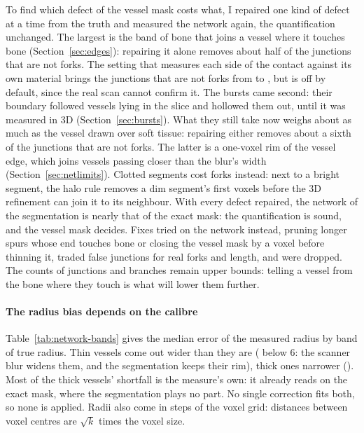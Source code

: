 To find which defect of the vessel mask costs what, I repaired one kind of defect at a time from the
truth and measured the network again, the quantification unchanged. The largest is the band of bone
that joins a vessel where it touches bone (Section~\ref{sec:edges}): repairing it alone removes about
half of the junctions that are not forks. The setting that measures each side of the contact against
its own material brings the junctions that are not forks from \pbValueExpDefaultSpurious{} to
\pbValueExpBoneSideSpurious, but is off by default, since the real scan cannot confirm it.
The bursts came second: their boundary followed vessels lying in the slice and hollowed them out,
until it was measured in 3D (Section~\ref{sec:bursts}). What they still take now weighs about as much
as the vessel drawn over soft tissue: repairing either removes about a sixth of the junctions that are
not forks. The latter is a one-voxel rim of the vessel edge, which joins vessels passing closer than
the blur's width (Section~\ref{sec:netlimits}). Clotted segments cost forks instead: next to a
bright segment, the halo rule removes a dim segment's first voxels before the 3D refinement can join it
to its neighbour. With every defect repaired, the network of the segmentation is nearly that of
the exact mask: the quantification is sound, and the vessel mask decides. Fixes tried on
the network instead, pruning longer spurs whose end touches bone or closing the vessel mask by a voxel
before thinning it, traded false junctions for real forks and length, and were dropped. The counts of
junctions and branches remain upper bounds: telling a vessel from the bone where they touch is what
will lower them further.

\paragraph{The radius bias depends on the calibre} Table~\ref{tab:network-bands} gives the median
error of the measured radius by band of true radius. Thin vessels come out wider than they are
(\pbValueNetSegRadiusThin\um{} below 6\um: the scanner blur widens them, and the
segmentation keeps their rim), thick ones narrower (\pbValueNetSegRadiusThick\um). Most of the thick vessels' shortfall is
the measure's own: it already reads \pbValueNetTrueRadiusThick\um{} on the exact mask, where the
segmentation plays no part. No single correction fits both, so none is applied. Radii also come in steps of the voxel grid: distances between voxel
centres are $\sqrt{k}$ times the voxel size.

